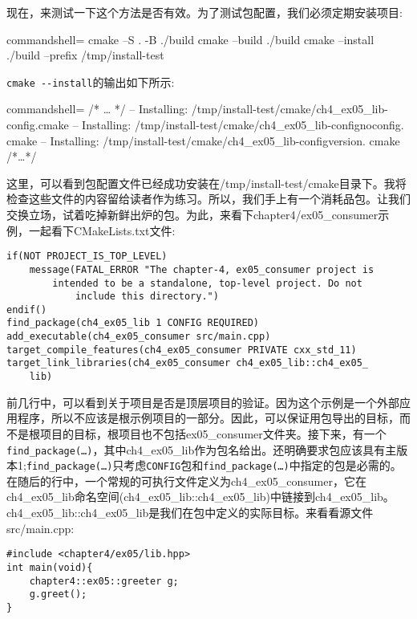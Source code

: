 现在，来测试一下这个方法是否有效。为了测试包配置，我们必须定期安装项目:

\begin{tcblisting}{commandshell={}}
cmake –S . -B ./build
cmake --build ./build
cmake --install ./build --prefix /tmp/install-test
\end{tcblisting}

\texttt{cmake -{}-install}的输出如下所示:

\begin{tcblisting}{commandshell={}}
/* … */
-- Installing: /tmp/install-test/cmake/ch4_ex05_lib-config.cmake
-- Installing: /tmp/install-test/cmake/ch4_ex05_lib-confignoconfig.
cmake
-- Installing: /tmp/install-test/cmake/ch4_ex05_lib-configversion.
cmake
/*…*/
\end{tcblisting}

这里，可以看到包配置文件已经成功安装在/tmp/install-test/cmake目录下。我将检查这些文件的内容留给读者作为练习。所以，我们手上有一个消耗品包。让我们交换立场，试着吃掉新鲜出炉的包。为此，来看下chapter4/ex05\_consumer示例，一起看下CMakeLists.txt文件:

\begin{lstlisting}[style=styleCMake]
if(NOT PROJECT_IS_TOP_LEVEL)
	message(FATAL_ERROR "The chapter-4, ex05_consumer project is
		intended to be a standalone, top-level project. Do not
			include this directory.")
endif()
find_package(ch4_ex05_lib 1 CONFIG REQUIRED)
add_executable(ch4_ex05_consumer src/main.cpp)
target_compile_features(ch4_ex05_consumer PRIVATE cxx_std_11)
target_link_libraries(ch4_ex05_consumer ch4_ex05_lib::ch4_ex05_
	lib)
\end{lstlisting}

前几行中，可以看到关于项目是否是顶层项目的验证。因为这个示例是一个外部应用程序，所以不应该是根示例项目的一部分。因此，可以保证用包导出的目标，而不是根项目的目标，根项目也不包括ex05\_consumer文件夹。接下来，有一个\texttt{find\_package(…)}，其中ch4\_ex05\_lib作为包名给出。还明确要求包应该具有主版本1;\texttt{find\_package(…)}只考虑\texttt{CONFIG}包和\texttt{find\_package(…)}中指定的包是必需的。在随后的行中，一个常规的可执行文件定义为ch4\_ex05\_consumer，它在ch4\_ex05\_lib命名空间(ch4\_ex05\_lib::ch4\_ex05\_lib)中链接到ch4\_ex05\_lib。ch4\_ex05\_lib::ch4\_ex05\_lib是我们在包中定义的实际目标。来看看源文件src/main.cpp:

\begin{lstlisting}[style=styleCXX]
#include <chapter4/ex05/lib.hpp>
int main(void){
	chapter4::ex05::greeter g;
	g.greet();
}
\end{lstlisting}

